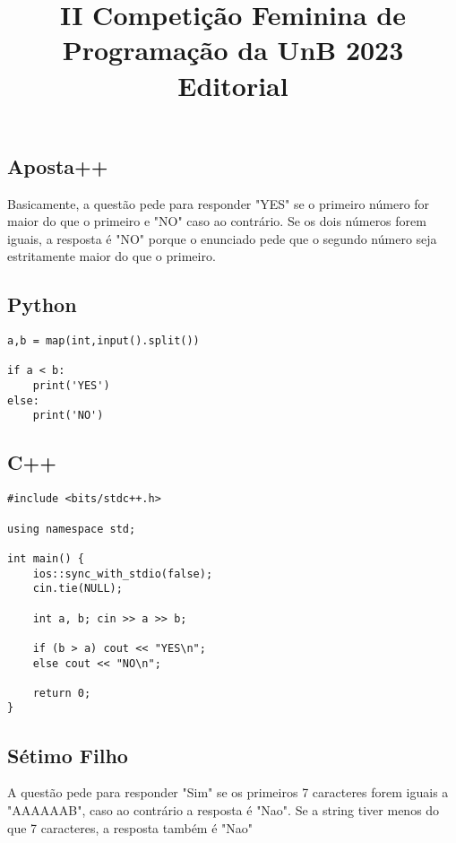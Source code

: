 \documentclass[11pt,fancychapters]{article}
\title{II Competição Feminina de Programação da UnB 2023 \\ Editorial}
\date{}
\begin{document}
\maketitle
{}
\newpage
{}
\tableofcontents
\newpage
{}

\begin{center}\section{Aposta++}\end{center}
\noindent
Basicamente, a questão pede para responder "YES" se o primeiro número for maior do que o primeiro e "NO" caso ao contrário. Se os dois números forem iguais, a resposta é "NO" porque o enunciado pede que o segundo número seja 
estritamente maior do que o primeiro.\\
\subsection{Python}
\begin{lstlisting}[style=python]
a,b = map(int,input().split())
 
if a < b:
    print('YES')
else:
    print('NO')

\end{lstlisting}
\subsection{C++}
\begin{lstlisting}[style=c++]
#include <bits/stdc++.h>

using namespace std;

int main() {
    ios::sync_with_stdio(false);
    cin.tie(NULL);
    
    int a, b; cin >> a >> b;

    if (b > a) cout << "YES\n";
    else cout << "NO\n";

    return 0;
}

\end{lstlisting}

\newpage
\begin{center}\section{Sétimo Filho}\end{center}
\noindent
A questão pede para responder "Sim" se os primeiros 7 caracteres forem iguais a "AAAAAAB", caso ao contrário a resposta é "Nao". Se a string tiver menos do que 7 caracteres, a resposta também é "Nao"\\
\end{document}
